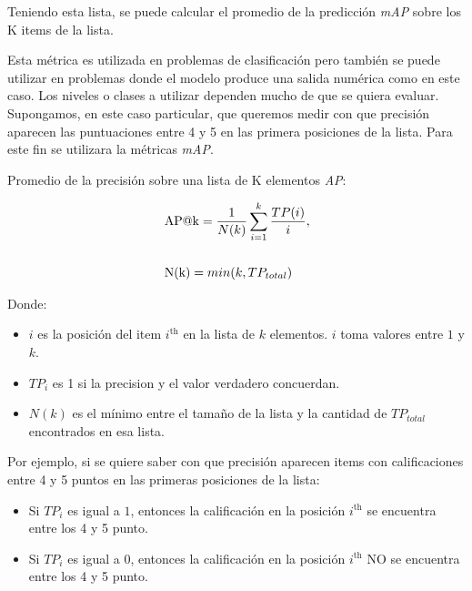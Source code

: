 \documentclass[11pt,a4paper,twoside]{thesis}
\begin{document}
{Teniendo esta lista, se puede calcular el promedio de la predicción
\textit{mAP\makeatletter@k} sobre los K items de la lista.

Esta métrica es utilizada en problemas de clasificación pero también se puede
utilizar en problemas donde el modelo produce una salida numérica como en este
caso. Los niveles o clases a utilizar dependen mucho de que se quiera evaluar.
Supongamos, en este caso particular, que queremos medir con que precisión
aparecen las puntuaciones entre 4 y 5 en las primera posiciones de la lista.
Para este fin se utilizara la métricas \textit{mAP\makeatletter@k}.

\begin{description}
	\item[Promedio de la precisión sobre una lista de K elementos
	\textit{AP\makeatletter@k}:]
\end{description}
\begin{equation}
	\begin{split}
		& \operatorname{AP\makeatletter@k}=\frac{1}{N(k)} \sum_{i=1}^k \frac{ TP(i)}{i}, \\
		& \\
		& \operatorname{N(k)} = min(k, TP_{total}) \\
	\end{split}
\end{equation}
\begin{description}
	\item[Donde:]
\end{description}
\begin{itemize}
	\item $i$ es la posición del item $i^\mathrm{th}$ en la lista de $k$ elementos. $i$  toma valores entre $1$ y $k$.
	\item $TP_i$ es 1 si la precision y el valor verdadero concuerdan.
	\item $N(k)$ es el mínimo entre el tamaño de la lista y la cantidad de $TP_{total}$ encontrados en esa lista.
\end{itemize}

Por ejemplo, si se quiere saber con que precisión aparecen items con
calificaciones entre 4 y 5 puntos en las primeras posiciones de la lista:

\begin{itemize}
	\item Si $TP_i$ es igual a $1$, entonces la calificación en la posición
	      $i^\mathrm{th}$ se encuentra entre los 4 y 5 punto.
	\item Si $TP_i$ es igual a $0$, entonces la calificación en la posición
	      $i^\mathrm{th}$ NO se encuentra entre los 4 y 5 punto.
\end{itemize}

}
\end{document}
